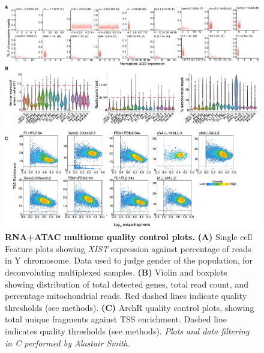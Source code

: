 \begin{figure}[p]
    \centering
    \includegraphics[width=\textwidth,height=\textheight,keepaspectratio]{figures/appendix/app_multiome-qc.png}
    \caption[{RNA+ATAC multiome quality control plots.}]
    {\textbf{RNA+ATAC multiome quality control plots.} 
    \textbf{(A)} Single cell Feature plots showing \textit{XIST} expression against percentage of reads in Y chromosome. Data used to judge gender of the population, for deconvoluting multiplexed samples.
    \textbf{(B)} Violin and boxplots showing distribution of total detected genes, total read count, and percentage mitochondrial reads. Red dashed lines indicate quality thresholds (see methods).
    \textbf{(C)} ArchR quality control plots, showing total unique fragments against TSS enrichment. Dashed line indicates quality thresholds (see methods). 
    \textit{Plots and data filtering in C performed by Alastair Smith.}
    }
    \label{fig:app_multiome-qc}
\end{figure}
\clearpage

